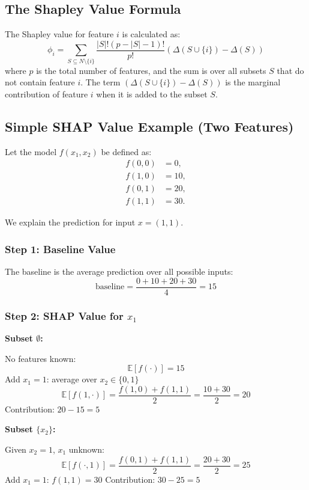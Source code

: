 \documentclass{article}
\begin{document}
\begin{multicols}{2}
	\subsection{The Shapley Value Formula}
	The Shapley value for feature $i$ is calculated as:
	$$ \phi_i = \sum_{S \subseteq N \setminus \{i\}} \frac{|S|!(p - |S| - 1)!}{p!} \left( \Delta(S \cup \{i\}) - \Delta(S) \right) $$
	where $p$ is the total number of features, and the sum is over all subsets $S$ that do not contain feature $i$. The term $(\Delta(S \cup \{i\}) - \Delta(S))$ is the marginal contribution of feature $i$ when it is added to the subset $S$.


	\subsection{Simple SHAP Value Example (Two Features)}

	Let the model \( f(x_1, x_2) \) be defined as:
	\[
		\begin{aligned}
			f(0,0) & = 0,  \\
			f(1,0) & = 10, \\
			f(0,1) & = 20, \\
			f(1,1) & = 30.
		\end{aligned}
	\]

	We explain the prediction for input \( x = (1, 1) \).

	\subsubsection{Step 1: Baseline Value}

	The baseline is the average prediction over all possible inputs:
	\[
		\text{baseline} = \frac{0 + 10 + 20 + 30}{4} = 15
	\]

	\subsubsection{Step 2: SHAP Value for \( x_1 \)}

	\textbf{Subset \(\emptyset\):}

	No features known:
	\[
		\mathbb{E}[f(\cdot)] = 15
	\]
	Add \( x_1 = 1 \): average over \( x_2 \in \{0,1\} \)
	\[
		\mathbb{E}[f(1, \cdot)] = \frac{f(1,0) + f(1,1)}{2} = \frac{10 + 30}{2} = 20
	\]
	Contribution: \( 20 - 15 = 5 \)

	\medskip
	\textbf{Subset \(\{x_2\}\):}

	Given \( x_2 = 1 \), \( x_1 \) unknown:
	\[
		\mathbb{E}[f(\cdot, 1)] = \frac{f(0,1) + f(1,1)}{2} = \frac{20 + 30}{2} = 25
	\]
	Add \( x_1 = 1 \): \( f(1,1) = 30 \)
	Contribution: \( 30 - 25 = 5 \)


\end{multicols}
\end{document}
